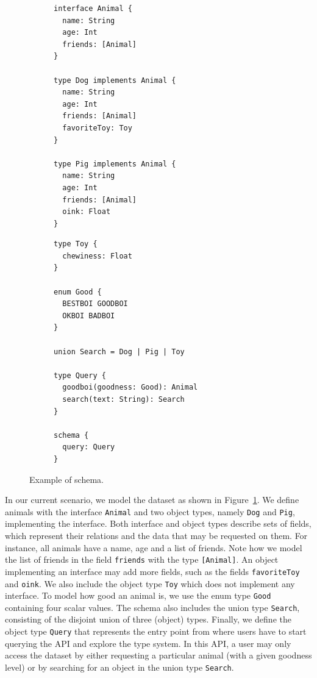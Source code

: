 \begin{figure}
    \centering
    \begin{subfigure}{.5\linewidth}
    
    \begin{verbatim}
interface Animal {		
  name: String
  age: Int
  friends: [Animal]
}

type Dog implements Animal {
  name: String
  age: Int
  friends: [Animal]
  favoriteToy: Toy
}

type Pig implements Animal {
  name: String
  age: Int
  friends: [Animal]
  oink: Float
}
    \end{verbatim}
    \end{subfigure}%
    \begin{subfigure}{.5\linewidth}
    \begin{verbatim}
type Toy {
  chewiness: Float
}

enum Good { 
  BESTBOI GOODBOI 
  OKBOI BADBOI 
}

union Search = Dog | Pig | Toy

type Query {
  goodboi(goodness: Good): Animal
  search(text: String): Search
}

schema {
  query: Query
}
    \end{verbatim}
    \end{subfigure}
    
    \caption{Example of \gql schema.}
    \label{fig:schema_ex}
\end{figure}

In our current scenario, we model the \goodbois dataset as shown in Figure~\ref{fig:schema_ex}. 
We define animals with the interface \texttt{Animal} and two object
types, namely \texttt{Dog} and \texttt{Pig}, implementing the interface. 
Both interface and object types describe sets of fields, which represent their relations and the data that may be requested on them. 
For instance, all animals have a name, age and a list of friends. Note how we model the list of friends in the field \texttt{friends} with the type \texttt{[Animal]}.
An object implementing an interface may add more fields, such as the fields \texttt{favoriteToy} and \texttt{oink}.
We also include the object type \texttt{Toy} which does not implement any interface. 
To model how good an animal is, we use the enum type \texttt{Good}
containing four scalar values. %
The schema also includes the union type \texttt{Search}, consisting of
the disjoint union of three (object) types. %
Finally, we define the object type \texttt{Query} that represents the entry point from where users have to 
start querying the API and explore the type system. In this API, a user may only access the \goodbois dataset by 
either requesting a particular animal (with a given goodness level) or by searching for an object in the union type \texttt{Search}.



